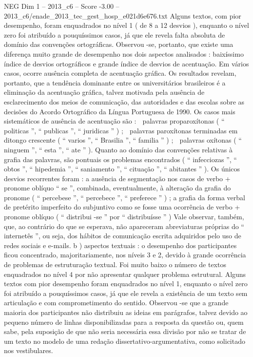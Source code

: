 \begin{textsample}{NEG Dim 1 – 2013\_c6 – Score -3.00 – 2013\_c6/enade\_2013\_tec\_gest\_hosp\_e021d6e676.txt}
Alguns textos, com pior desempenho, foram enquadrados no nível 1 ( de 8 a 12 desvios ), enquanto o nível zero foi atribuído a pouquíssimos casos, já que ele revela falta absoluta de domínio das convenções ortográficas.
Observou -se, portanto, que existe uma diferença muito grande de desempenho nos dois aspectos analisados : baixíssimo índice de desvios ortográficos e grande índice de desvios de acentuação.
Em vários casos, ocorre ausência completa de acentuação gráfica.
Os resultados revelam, portanto, que a tendência dominante entre os universitários brasileiros é a eliminação da acentuação gráfica, talvez motivada pela ausência de esclarecimento dos meios de comunicação, das autoridades e das escolas sobre as decisões do Acordo Ortográfico da Língua Portuguesa de 1990.
Os casos mais sistemáticos de ausência de acentuação são :  palavras proparoxítonas ( “ politicas ”, “ publicas ”, “ juridicas ” ) ;  palavras paroxítonas terminadas em ditongo crescente ( “ varios ”, “ Brasilia ”, “ familia ” ) ;  palavras oxítonas ( “ ninguem ”, “ esta ”, “ ate ” ).
Quanto ao domínio das convenções relativas à grafia das palavras, são pontuais os problemas encontrados ( “ infecciozas ”, “ obtos ”, “ hipedemia ”, “ saniamento ”, “ cituação ”, “ abitantes ” ).
Os únicos desvios recorrentes foram : a ausência de segmentação nos casos de verbo + pronome oblíquo “ se ”, combinada, eventualmente, à alteração da grafia do pronome ( “ percebese ”, “ percebece ”, “ preferece ” ) ; a grafia da forma verbal de pretérito imperfeito do subjuntivo como se fosse uma ocorrência de verbo + pronome oblíquo ( “ distribui -se ” por “ distribuísse ” ) Vale observar, também, que, ao contrário do que se esperava, não apareceram abreviaturas próprias do “ internetês ”, ou seja, dos hábitos de comunicação escrita adquiridos pelo uso de redes sociais e e-mails. b ) aspectos textuais : o desempenho dos participantes ficou concentrado, majoritariamente, nos níveis 3 e 2, devido à grande ocorrência de problemas de estruturação textual.
Foi muito baixo o número de textos enquadrados no nível 4 por não apresentar qualquer problema estrutural.
Alguns textos com pior desempenho foram enquadrados no nível 1, enquanto o nível zero foi atribuído a pouquíssimos casos, já que ele revela a existência de um texto sem articulação e com comprometimento do sentido.
Observou -se que a grande maioria dos participantes não distribuiu as ideias em parágrafos, talvez devido ao pequeno número de linhas disponibilizadas para a resposta da questão ou, quem sabe, pela suposição de que não seria necessária essa divisão por não se tratar de um texto no modelo de uma redação dissertativo-argumentativa, como solicitado nos vestibulares.

\end{textsample}
